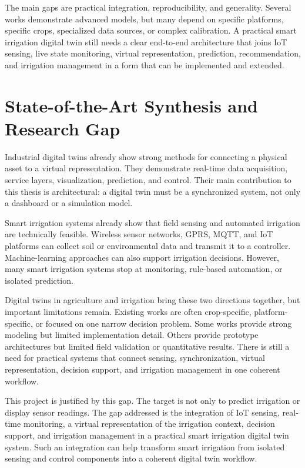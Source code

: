 The main gaps are practical integration, reproducibility, and generality. Several works demonstrate advanced models, but many depend on specific platforms, specific crops, specialized data sources, or complex calibration. A practical smart irrigation digital twin still needs a clear end-to-end architecture that joins IoT sensing, live state monitoring, virtual representation, prediction, recommendation, and irrigation management in a form that can be implemented and extended.

\section{State-of-the-Art Synthesis and Research Gap}

Industrial digital twins already show strong methods for connecting a physical asset to a virtual representation. They demonstrate real-time data acquisition, service layers, visualization, prediction, and control. Their main contribution to this thesis is architectural: a digital twin must be a synchronized system, not only a dashboard or a simulation model.

Smart irrigation systems already show that field sensing and automated irrigation are technically feasible. Wireless sensor networks, GPRS, MQTT, and IoT platforms can collect soil or environmental data and transmit it to a controller. Machine-learning approaches can also support irrigation decisions. However, many smart irrigation systems stop at monitoring, rule-based automation, or isolated prediction.

Digital twins in agriculture and irrigation bring these two directions together, but important limitations remain. Existing works are often crop-specific, platform-specific, or focused on one narrow decision problem. Some works provide strong modeling but limited implementation detail. Others provide prototype architectures but limited field validation or quantitative results. There is still a need for practical systems that connect sensing, synchronization, virtual representation, decision support, and irrigation management in one coherent workflow.

This project is justified by this gap. The target is not only to predict irrigation or display sensor readings. The gap addressed is the integration of IoT sensing, real-time monitoring, a virtual representation of the irrigation context, decision support, and irrigation management in a practical smart irrigation digital twin system. Such an integration can help transform smart irrigation from isolated sensing and control components into a coherent digital twin workflow.
